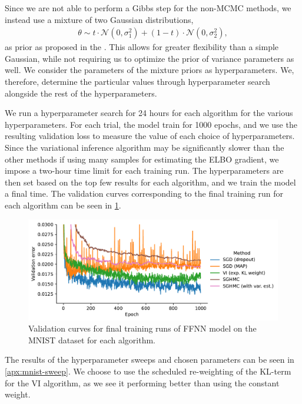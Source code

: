 Since we are not able to perform a Gibbs step for the non-MCMC methods, we instead use a mixture of two Gaussian distributions,
\begin{align}
    \theta \sim t\cdot \mathcal{N}(0, \sigma_1^2) + (1-t)\cdot \mathcal{N}(0, \sigma_2^2),
\end{align}
as prior as proposed in the \autocite{blundell_weight_2015}.
This allows for greater flexibility than a simple Gaussian, while not requiring us to optimize the prior of variance parameters as well.
We consider the parameters of the mixture priors as hyperparameters.
We, therefore, determine the particular values through hyperparameter search alongside the rest of the hyperparameters.

We run a hyperparameter search for 24 hours for each algorithm for the various hyperparameters. 
For each trial, the model train for 1000 epochs, and we use the resulting validation loss to measure the value of each choice of hyperparameters.  
Since the variational inference algorithm may be significantly slower than the other methods if using many samples for estimating the ELBO gradient, we impose a two-hour time limit for each training run. 
The hyperparameters are then set based on the top few results for each algorithm, and we train the model a final time.
The validation curves corresponding to the final training run for each algorithm can be seen in \cref{fig:mnist-best-val-curves}.
\begin{figure}[htbp]
    \centering
    \includegraphics[width=\linewidth]{Figures/mnist-final-runs-val.pdf}
    \caption{Validation curves for final training runs of FFNN model on the MNIST dataset for each algorithm.}
    \label{fig:mnist-best-val-curves}
\end{figure}
The results of the hyperparameter sweeps and chosen parameters can be seen in \cref{apx:mnist-sweep}.
We choose to use the scheduled re-weighting of the KL-term for the VI algorithm, as we see it performing better than using the constant weight.

